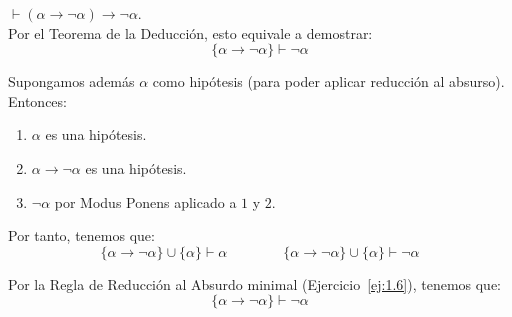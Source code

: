 \begin{ejercicio}\label{ej:1.16}
    $\vdash (\alpha \rightarrow \neg\alpha) \rightarrow \neg\alpha$.\\

    Por el Teorema de la Deducción, esto equivale a demostrar:
    \begin{equation*}
        \{\alpha\rightarrow\neg\alpha\} \vdash \neg\alpha
    \end{equation*}

    Supongamos además $\alpha$ como hipótesis (para poder aplicar reducción al absurso). Entonces:
    \begin{enumerate}
        \item $\alpha$ es una hipótesis.
        \item $\alpha\rightarrow\neg\alpha$ es una hipótesis.
        \item $\neg\alpha$ por Modus Ponens aplicado a $1$ y $2$.
    \end{enumerate}

    Por tanto, tenemos que:
    \begin{equation*}
        \{\alpha\rightarrow\neg\alpha\}\cup \{\alpha\} \vdash \alpha\qquad \qquad 
        \{\alpha\rightarrow\neg\alpha\}\cup \{\alpha\} \vdash \neg\alpha
    \end{equation*}

    Por la Regla de Reducción al Absurdo minimal (Ejercicio~\ref{ej:1.6}), tenemos que:
    \begin{equation*}
        \{\alpha\rightarrow\neg\alpha\} \vdash \neg\alpha
    \end{equation*}
\end{ejercicio}

